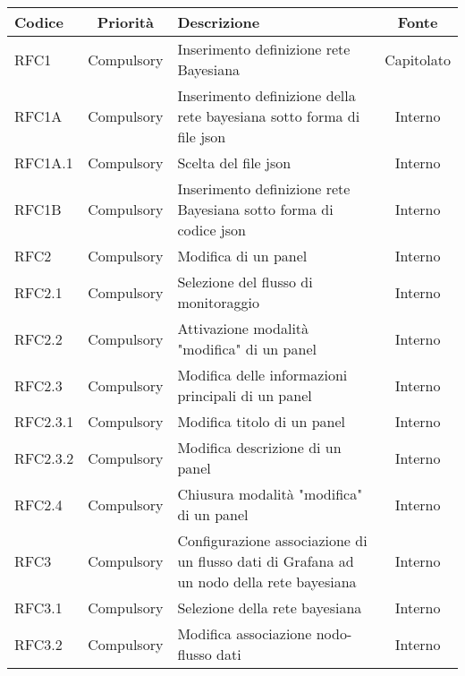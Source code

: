         \begin{table}[!htpb]
            \centering
            \renewcommand{\arraystretch}{1.5} %
            \begin{tabular}{|l|c|p{9cm}|c|}
                \rowcolor{orange!50}
        		\hline
        		\textbf{Codice} & \textbf{Priorità} & \textbf{Descrizione} & \textbf{Fonte}\\
                \hline
                RFC1 & Compulsory & Inserimento definizione rete Bayesiana & Capitolato\\
                \hline
                RFC1A & Compulsory & Inserimento definizione della rete bayesiana sotto forma di file json & Interno\\
                \hline
                RFC1A.1 & Compulsory & Scelta del file json & Interno\\
                \hline
                RFC1B & Compulsory & Inserimento definizione rete Bayesiana sotto forma di codice json & Interno\\
                \hline
                RFC2 & Compulsory & Modifica di un panel & Interno\\
                \hline
                RFC2.1 & Compulsory & Selezione del flusso di monitoraggio & Interno\\
                \hline
                RFC2.2 & Compulsory & Attivazione modalità "modifica" di un panel & Interno\\
                \hline
                RFC2.3 & Compulsory & Modifica delle informazioni principali di un panel & Interno\\
                \hline
                RFC2.3.1 & Compulsory & Modifica titolo di un panel & Interno\\
                \hline
                RFC2.3.2 & Compulsory & Modifica descrizione di un panel & Interno\\
                \hline
                RFC2.4 & Compulsory & Chiusura modalità "modifica" di un panel & Interno\\
                \hline
                RFC3 & Compulsory & Configurazione associazione di un flusso dati di Grafana ad un nodo della rete bayesiana & Interno\\
                \hline
                RFC3.1 & Compulsory & Selezione della rete bayesiana & Interno\\
                \hline
                RFC3.2 & Compulsory &  Modifica associazione nodo-flusso dati & Interno\\

\end{tabular}
\end{table}
